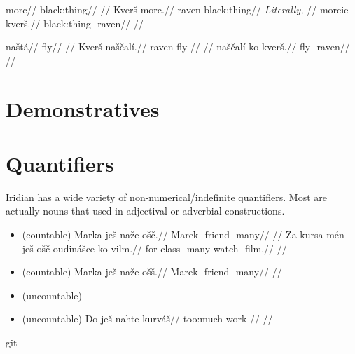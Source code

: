 \pex
\a
\begingl
\gla morc//
\glb black:thing//
\glft {}//
\endgl
\a
\begingl
\gla Kver\v{s} morc.//
\glb raven black:thing//
\glft {} \emph{Literally,} //
\endgl
\a
\begingl
\gla morcie kver\v{s}.//
\glb black:thing- raven//
\glft {}//
\endgl
\xe

\pex
\a
\begingl
\gla na\v{s}t\'a//
\glb fly//
\glft {}//
\endgl
\a
\begingl
\gla Kver\v{s} na\v{s}\v{c}al\'i.//
\glb raven fly-//
\glft {}//
\endgl
\a
\begingl
\gla na\v{s}\v{c}al\'i ko kver\v{s}.//
\glb fly-  raven//
\glft {}//
\endgl
\xe

\section{Demonstratives}\label{dem-adj}

\section{Quantifiers}
Iridian has a wide variety of non-numerical/indefinite quantifiers.  Most are actually nouns that used in adjectival or adverbial constructions.


\begin{itemize}
    \item {}  (countable)
    \ex
    \begingl
    \gla Marka je\v{s} na\v{z}e o\v{s}\v{c}.//
    \glb Marek-  friend- many//
    \glft {}//
    \endgl
    \xe
    \ex
    \begingl
    \gla Za kursa m\'en je\v{s} o\v{s}\v{c} oudin\'a\v{s}ce ko vilm.//
    \glb for class-   many watch-  film.//
    \glft {}//
    \endgl
    \xe
    \item {}  (countable)
    \ex
    \begingl
    \gla Marka je\v{s} na\v{z}e o\v{s}\v{s}.//
    \glb Marek-  friend- many//
    \glft {}//
    \endgl
    \xe
    \item {}  (uncountable)
    \item {}  (uncountable)
    \ex
    \begingl
    \gla Do je\v{s} nahte kurv\'a\v{s}//
    \glb {}  too:much work-//
    \glft {}//
    \endgl
    \xe

\end{itemize}git
